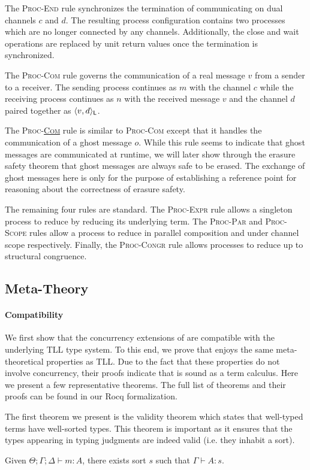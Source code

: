 The \textsc{Proc-End} rule synchronizes the termination of communicating on dual 
channels $c$ and $d$. The resulting process configuration contains two processes
which are no longer connected by any channels. Additionally, the close and wait 
operations are replaced by unit return values once the termination is synchronized.

The \textsc{Proc-Com} rule governs the communication of a real message $v$ from
a sender to a receiver. The sending process continues as $m$ with the channel
$c$ while the receiving process continues as $n$ with the received
message $v$ and the channel $d$ paired together as $\langle{{v},{d}}\rangle_{\textsf{L}}$.

The \textsc{Proc-\underline{Com}} rule is similar to \textsc{Proc-Com} except
that it handles the communication of a ghost message $o$. While this rule seems
to indicate that ghost messages are communicated at runtime, we will later show
through the erasure safety theorem that ghost messages are always safe to be erased.
The exchange of ghost messages here is only for the purpose of establishing a 
reference point for reasoning about the correctness of erasure safety.

The remaining four rules are standard. The \textsc{Proc-Expr} rule allows a
singleton process to reduce by reducing its underlying term. The \textsc{Proc-Par} and
\textsc{Proc-Scope} rules allow a process to reduce in parallel composition and
under channel scope respectively. Finally, the \textsc{Proc-Congr} rule allows
processes to reduce up to structural congruence.

\subsection{Meta-Theory}
\paragraph{\textbf{Compatibility}}
We first show that the concurrency extensions of \TLLC{} are compatible with the
underlying TLL type system. To this end, we prove that \TLLC{} enjoys the same
meta-theoretical properties as TLL. Due to the fact that these properties do not involve 
concurrency, their proofs indicate that \TLLC{} is sound as a term calculus.
Here we present a few representative theorems. The full list of theorems and their proofs
can be found in our Rocq formalization.

The first theorem we present is the validity theorem which states that
well-typed terms have well-sorted types. This theorem is important as it
ensures that the types appearing in typing judgments are indeed valid (i.e. they inhabit a sort).
\begin{theorem}[Validity]
  Given $\Theta ; \Gamma ; \Delta \vdash m : A$, there exists
  sort $s$ such that $\Gamma \vdash A : s$.
\end{theorem}

